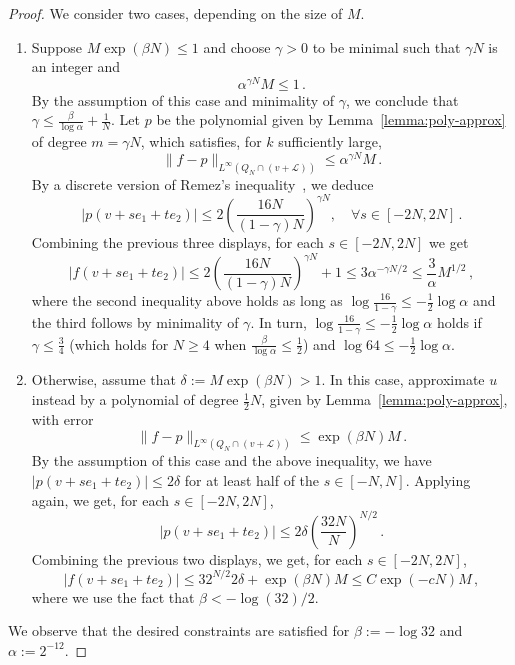 \documentclass{daj}
\begin{document}
\begin{proof}
	We consider two cases, depending on the size of $M$.
	\begin{enumerate}
		\item
		Suppose $M\exp(\beta N) \leq 1$ and choose $\gamma > 0$ to be minimal such that $\gamma N$ is an integer and
		\begin{equation*}
			\alpha^{\gamma N}M \leq 1 \, .
		\end{equation*}
		By the assumption of this case and minimality of $\gamma$, we conclude that $\gamma \leq \frac{\beta}{\log \alpha} + \frac{1}{N}$.
		Let $p$ be the polynomial given by Lemma~\ref{lemma:poly-approx} of degree $m=\gamma N$, which satisfies, for $k$ sufficiently large,
		\begin{equation*}
			\|f-p\|_{L^\infty(Q_{N} \cap (v + \mathcal{L}))} \leq \alpha^{\gamma N}M \, .
		\end{equation*}
		By a discrete version of Remez's inequality~\cite[Corollary~2.2]{buhovsky2022discrete}, we deduce
		\begin{equation*}
			|p(v + se_1 + te_2)| \leq 2{\left(\frac{16N}{(1-\gamma)N}\right)}^{\gamma N}, \quad \forall s \in [-2N, 2N] \, .
		\end{equation*}
		Combining the previous three displays, for each $s \in [-2N, 2N]$ we get
		\begin{equation*}
			|f(v + se_1 + te_2)| \leq 2{\left(\frac{16N}{(1-\gamma)N}\right)}^{\gamma N} + 1 \leq 3 \alpha^{-\gamma N/2} \leq \frac{3}{\alpha} M^{1/2} \, ,
		\end{equation*}
		where the second inequality above holds as long as $\log \frac{16}{1 - \gamma} \leq -\frac{1}{2}\log \alpha$ and the third follows by minimality of $\gamma$. In turn, $\log \frac{16}{1 - \gamma} \leq -\frac{1}{2}\log \alpha$ holds if $\gamma \leq \frac{3}{4}$ (which holds for $N \geq 4$ when $\frac{\beta}{\log \alpha} \leq \frac12$) and $\log 64 \leq -\frac{1}{2} \log \alpha$.
		\item
		
		Otherwise, assume that $\delta := M\exp(\beta N) > 1$. In this case, approximate $u$ instead by a polynomial of degree $\frac{1}{2}N$, given by Lemma~\ref{lemma:poly-approx}, with error
		\begin{equation*}
			\|f-p\|_{L^\infty(Q_{N} \cap (v + \mathcal{L}))} \leq \exp(\beta N)M \, .
		\end{equation*}
		By the assumption of this case and the above inequality, we have $|p(v + se_1 + te_2)| \leq 2\delta$ for at least half of the $s \in [-N, N]$. Applying~\cite[Corollary~2.2]{buhovsky2022discrete} again, we get, for each $s \in [-2N, 2N]$,
		\begin{equation*}
			|p(v + se_1 + te_2)| \leq 2\delta {\left(\frac{32N}{N}\right)}^{N/2} \, .
		\end{equation*}
		Combining the previous two displays, we get, for each $s \in [-2N, 2N]$,
		\[
		|f(v + se_1 + te_2)| \leq {32}^{N/2}2\delta + \exp(\beta N)M \leq C\exp(-cN)M \, ,
		\]
		where we use the fact that $\beta < -\log(32)/2$.
	\end{enumerate}
	We observe that the desired constraints are satisfied for $\beta := -\log 32$ and $\alpha := 2^{-12}$.
\end{proof}
\end{document}
